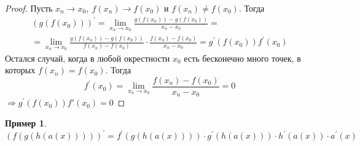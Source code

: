 \documentclass[a4paper, 12pt]{article}
\theoremstyle{definition}
\newtheorem*{comm}{Замечание}
\newtheorem*{example}{Пример}
\begin{document}
        \begin{proof}
            Пусть $x_n\to x_0,\ f(x_n)\to f(x_0)$ и $f(x_n)\ne f(x_0)$. Тогда 
            \begin{multline*}
                (g(f(x_0)))^{\prime}=\lim\limits_{x_n\to x_0}\frac{g(f(x_n))-g(f(x_0))}{x_n-x_0}=\\
                =\lim\limits_{x_n\to x_0}\frac{g(f(x_n))-g(f(x_0))}{f(x_n)-f(x_0)}\cdot \frac{f(x_n)-f(x_0)}{x_n-x_0}=g^{\prime}(f(x_0))f^{\prime}(x_0)
            \end{multline*}
            Остался случай, когда в любой окрестности $x_0$ есть бесконечно много точек, в которых $f(x_n)=f(x_0)$. Тогда
            \[f^{\prime}(x_0)=\lim\limits_{x_n\to x_0}\frac{f(x_n)-f(x_0)}{x_n-x_0}=0\]
            $\Rightarrow g^{\prime}(f(x_0))f'(x_0)=0$
        \end{proof}  
        \begin{example}
            $(f(g(h(a(x)))))^{\prime}=f^{\prime}(g(h(a(x))))\cdot g^{\prime}(h(a(x)))\cdot h^{\prime}(a(x))\cdot a^{\prime}(x)$
        \end{example}
\end{document}
